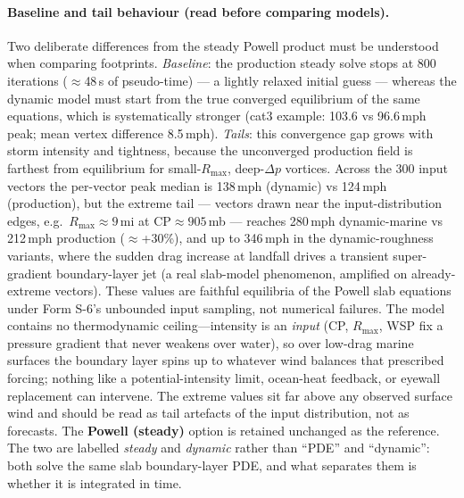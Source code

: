 \documentclass[11pt]{article}
\begin{document}
\paragraph{Baseline and tail behaviour (read before comparing models).}
Two deliberate differences from the steady Powell product must be understood when
comparing footprints. \emph{Baseline}: the production steady solve stops at 800
iterations ($\approx$48\,s of pseudo-time) --- a lightly relaxed initial guess ---
whereas the dynamic model must start from the true converged equilibrium of the same
equations, which is systematically stronger (cat3 example: 103.6 vs 96.6\,mph peak;
mean vertex difference 8.5\,mph). \emph{Tails}: this convergence gap grows with
storm intensity and tightness, because the unconverged production field is farthest
from equilibrium for small-$R_{\max}$, deep-$\Delta p$ vortices. Across the 300
input vectors the per-vector peak median is 138\,mph (dynamic) vs 124\,mph
(production), but the extreme tail --- vectors drawn near the input-distribution
edges, e.g.\ $R_{\max}\!\approx\!9$\,mi at $\mathrm{CP}\!\approx\!905$\,mb ---
reaches 280\,mph dynamic-marine vs 212\,mph production ($\approx$+30\%), and up to
346\,mph in the dynamic-roughness variants, where the sudden drag increase at
landfall drives a transient super-gradient boundary-layer jet (a real slab-model
phenomenon, amplified on already-extreme vectors). These values are faithful
equilibria of the Powell slab equations under Form S-6's unbounded input sampling,
not numerical failures. The model contains no thermodynamic ceiling---intensity is
an \emph{input} (CP, $R_{\max}$, WSP fix a pressure gradient that never weakens over
water), so over low-drag marine surfaces the boundary layer spins up to whatever
wind balances that prescribed forcing; nothing like a potential-intensity limit,
ocean-heat feedback, or eyewall replacement can intervene. The extreme values sit
far above any observed surface wind and should be read as tail artefacts of the
input distribution, not as forecasts. The \textbf{Powell (steady)} option is retained unchanged as the
reference. The two are labelled \emph{steady} and \emph{dynamic} rather than ``PDE''
and ``dynamic'': both solve the same slab boundary-layer PDE, and what separates them
is whether it is integrated in time.
\end{document}
